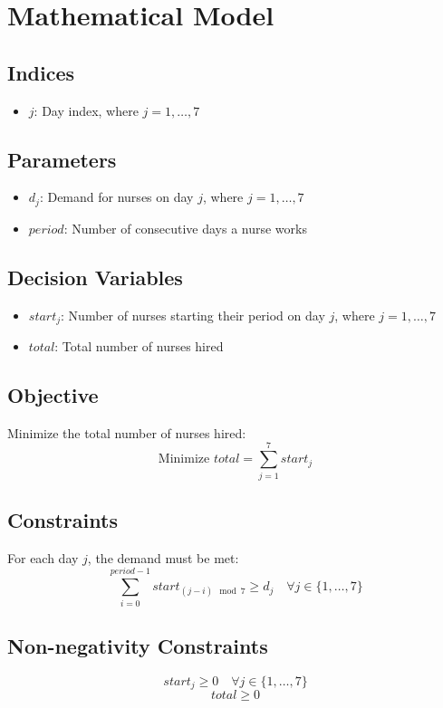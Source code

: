 \documentclass{article}
\begin{document}
\section*{Mathematical Model}

\subsection*{Indices}
\begin{itemize}
    \item $j$: Day index, where $j = 1, \ldots, 7$
\end{itemize}

\subsection*{Parameters}
\begin{itemize}
    \item $d_j$: Demand for nurses on day $j$, where $j = 1,\ldots,7$
    \item $period$: Number of consecutive days a nurse works
\end{itemize}

\subsection*{Decision Variables}
\begin{itemize}
    \item $start_j$: Number of nurses starting their period on day $j$, where $j = 1, \ldots, 7$
    \item $total$: Total number of nurses hired
\end{itemize}

\subsection*{Objective}
Minimize the total number of nurses hired:
\[
\text{Minimize } total = \sum_{j=1}^{7} start_j
\]

\subsection*{Constraints}
For each day $j$, the demand must be met:
\[
\sum_{i=0}^{period-1} start_{(j-i) \mod 7} \geq d_j \quad \forall j \in \{1,\ldots, 7\}
\]

\subsection*{Non-negativity Constraints}
\[
start_j \geq 0 \quad \forall j \in \{1,\ldots, 7\}
\]
\[
total \geq 0
\]
\end{document}
